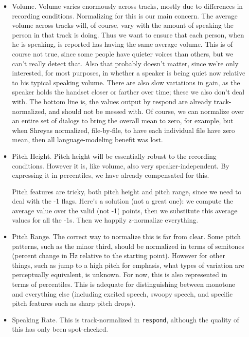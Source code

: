\documentclass[11pt]{article}
\begin{document}
\begin{itemize}   \setlength{\itemsep}{0pt}\setlength{\parskip}{0pt}
\item Volume.  Volume varies enormously across tracks, mostly due to
  differences in recording conditions.  Normalizing for this is our
  main concern.  The average volume across tracks will, of course,
  vary with the amount of speaking the person in that track is doing.
  Thus we want to ensure that each person, when he is speaking, is
  reported has having the same average volume.  This is of course not
  true, since some people have quieter voices than others, but we
  can't really detect that.  Also that probably doesn't matter, since
  we're only interested, for most purposes, in whether a speaker is
  being quiet now relative to his typical speaking volume.  There are
  also slow variations in gain, as the speaker holds the handset
  closer or farther over time; these we also don't deal with.  The
  bottom line is, the values output by respond are already
  track-normalized, and should not be messed with.  Of course, we can
  normalize over an entire set of dialogs to bring the overall mean to
  zero, for example, but when Shreyas normalized, file-by-file, to
  have each individual file have zero mean, then all language-modeling
  benefit was lost.
\item Pitch Height.  Pitch height will be essentially robust to the
  recording conditions.  However it is, like volume, also very
  speaker-independent.  By expressing it in percentiles, we have
  already compensated for this.

  Pitch features are tricky, both pitch height and pitch range, since we
  need to deal with the -1 flags.  Here's a solution (not a great one):
  we compute the average value over the valid (not -1) points, then we
  substitute this average values for all the -1s. Then we happily
  z-normalize everything.

\item Pitch Range.  The correct way to normalize this is far from
  clear.  Some pitch patterns, such as the minor third, should be
  normalized in terms of semitones (percent change in Hz relative to
  the starting point).  However for other things, such as jump to a
  high pitch for emphasis, what types of variation are perceptually
  equivalent, is unknown.  For now, this is also represented in terms
  of percentiles.  This is adequate for distinguishing between
  monotone and everything else (including excited speech, swoopy
  speech, and specific pitch features such as sharp pitch drops).
\item Speaking Rate.  This is track-normalized in {\tt respond},
  although the quality of this has only been spot-checked. 
\end{itemize}
\end{document}
